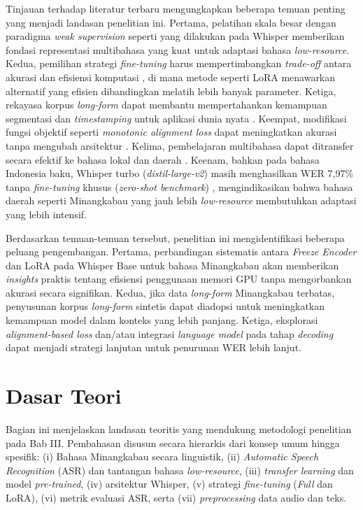 Tinjauan terhadap literatur terbaru mengungkapkan beberapa temuan penting yang menjadi landasan penelitian ini. Pertama, pelatihan skala besar dengan paradigma \textit{weak supervision} seperti yang dilakukan pada Whisper \cite{radford2023whisper} memberikan fondasi representasi multibahasa yang kuat untuk adaptasi bahasa \textit{low-resource}. Kedua, pemilihan strategi \textit{fine-tuning} harus mempertimbangkan \textit{trade-off} antara akurasi dan efisiensi komputasi \cite{liu2024exploration}, di mana metode seperti LoRA menawarkan alternatif yang efisien dibandingkan melatih lebih banyak parameter. Ketiga, rekayasa korpus \textit{long-form} dapat membantu mempertahankan kemampuan segmentasi dan \textit{timestamping} untuk aplikasi dunia nyata \cite{timmel2024finetune}. Keempat, modifikasi fungsi objektif seperti \textit{monotonic alignment loss} dapat meningkatkan akurasi tanpa mengubah arsitektur \cite{zhuang2025monotonic}. Kelima, pembelajaran multibahasa dapat ditransfer secara efektif ke bahasa lokal dan daerah \cite{arisaputra2022xlsr53}. Keenam, bahkan pada bahasa Indonesia baku, Whisper turbo (\textit{distil-large-v2}) masih menghasilkan WER 7,97\% tanpa \textit{fine-tuning} khusus (\textit{zero-shot benchmark}) \cite{martin2026speechsummary}, mengindikasikan bahwa bahasa daerah seperti Minangkabau yang jauh lebih \textit{low-resource} membutuhkan adaptasi yang lebih intensif.

Berdasarkan temuan-temuan tersebut, penelitian ini mengidentifikasi beberapa peluang pengembangan. Pertama, perbandingan sistematis antara \textit{Freeze Encoder} dan LoRA pada Whisper Base untuk bahasa Minangkabau akan memberikan \textit{insights} praktis tentang efisiensi penggunaan memori GPU tanpa mengorbankan akurasi secara signifikan. Kedua, jika data \textit{long-form} Minangkabau terbatas, penyusunan korpus \textit{long-form} sintetis dapat diadopsi untuk meningkatkan kemampuan model dalam konteks yang lebih panjang. Ketiga, eksplorasi \textit{alignment-based loss} dan/atau integrasi \textit{language model} pada tahap \textit{decoding} dapat menjadi strategi lanjutan untuk penurunan WER lebih lanjut.



\section{Dasar Teori}\label{II.Dasar Teori}

Bagian ini menjelaskan landasan teoritis yang mendukung metodologi penelitian pada Bab III. Pembahasan disusun secara hierarkis dari konsep umum hingga spesifik: (i) Bahasa Minangkabau secara linguistik, (ii) \textit{Automatic Speech Recognition} (ASR) dan tantangan bahasa \textit{low-resource}, (iii) \textit{transfer learning} dan model \textit{pre-trained}, (iv) arsitektur Whisper, (v) strategi \textit{fine-tuning} (\textit{Full} dan LoRA), (vi) metrik evaluasi ASR, serta (vii) \textit{preprocessing} data audio dan teks.

